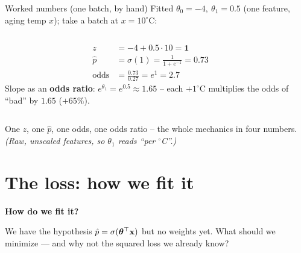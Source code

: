 \documentclass[aspectratio=169]{beamer}
\begin{document}
\begin{frame}{Worked numbers (one batch, by hand)}
  Fitted $\theta_0 = -4,\ \theta_1 = 0.5$ (one feature, aging temp $x$); take a batch at
  $x = 10^\circ$C:
  \begin{columns}[T]
    \begin{align*}
      z &= -4 + 0.5 \cdot 10 = \mathbf{1} \\[2pt]
      \hat p &= \sigma(1) = \tfrac{1}{1+e^{-1}} = \mathbf{0.73} \\[2pt]
      \text{odds} &= \tfrac{0.73}{0.27} = e^{1} = \mathbf{2.7}
    \end{align*}
    \vskip 2pt
    Slope as an \textbf{odds ratio}: $e^{\theta_1} = e^{0.5} \approx \mathbf{1.65}$ --
    each $+1^\circ$C multiplies the odds of ``bad'' by $1.65$ ($+65\%$).
    \begin{center}
    \end{center}
  \end{columns}
  \vskip 2pt
  \footnotesize One $z$, one $\hat p$, one odds, one odds ratio -- the whole mechanics in
  four numbers. \emph{(Raw, unscaled features, so $\theta_1$ reads ``per $^\circ$C''.)}
\end{frame}

\section{The loss: how we fit it}

\begin{frame}[plain]
  \vfill
  \begin{center}
    {\Large\color{popblue}\textbf{How do we fit it?}}\\[0.9em]
    \begin{minipage}{0.82\textwidth}\centering\small
      We have the hypothesis $\hat p = \sigma(\bm{\theta}^\top \mathbf{x})$ but no weights yet. What should we
      minimize --- and why not the squared loss we already know?
    \end{minipage}
  \end{center}
  \vfill
\end{frame}
\end{document}

